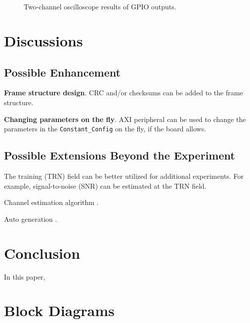 \documentclass[journal,twoside]{IEEEtran}
\begin{document}


    \begin{figure*}[t]
      \centering
      \\
      \\
      \caption{Two-channel oscilloscope results of GPIO outputs.}
      \label{fig:scope}
    \end{figure*}

  \section{Discussions}

    \subsection{Possible Enhancement}

      \textbf{Frame structure design}.
      CRC and/or checksums can be added to the frame structure.

      \textbf{Changing parameters on the fly}.
      AXI peripheral \cite{xilinx:pg127} can be used to change the parameters in the \texttt{Constant\_Config} on the fly,
      if the board allows.

    \subsection{Possible Extensions Beyond the Experiment}

      The training (TRN) field can be better utilized for additional experiments.
      For example, signal-to-noise (SNR) can be estimated at the TRN field.

      Channel estimation algorithm \cite{zhao2023ompl,you2023beam}.

      Auto generation \cite{zhao2023automatic}.

  \section{Conclusion}

    In this paper,


  \appendices

  \section{Block Diagrams}

  
  
\end{document}
